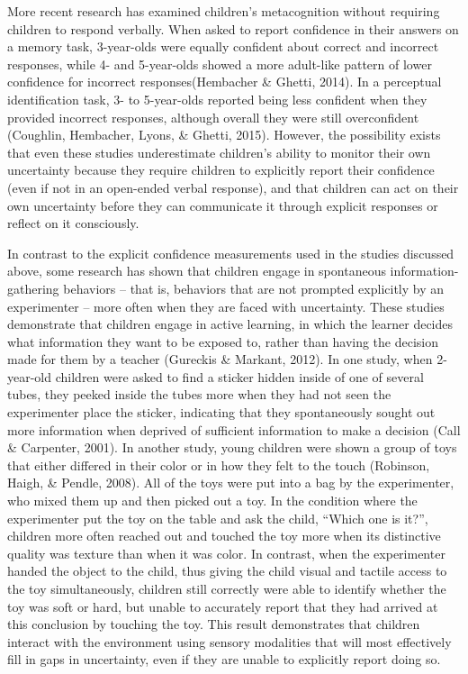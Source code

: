\documentclass[man]{apa6}
\theoremstyle{definition}
\theoremstyle{definition}
\theoremstyle{definition}
\theoremstyle{remark}
\begin{document}
More recent research has examined children's metacognition without
requiring children to respond verbally. When asked to report confidence
in their answers on a memory task, 3-year-olds were equally confident
about correct and incorrect responses, while 4- and 5-year-olds showed a
more adult-like pattern of lower confidence for incorrect
responses(Hembacher \& Ghetti, 2014). In a perceptual identification
task, 3- to 5-year-olds reported being less confident when they provided
incorrect responses, although overall they were still overconfident
(Coughlin, Hembacher, Lyons, \& Ghetti, 2015). However, the possibility
exists that even these studies underestimate children's ability to
monitor their own uncertainty because they require children to
explicitly report their confidence (even if not in an open-ended verbal
response), and that children can act on their own uncertainty before
they can communicate it through explicit responses or reflect on it
consciously.

In contrast to the explicit confidence measurements used in the studies
discussed above, some research has shown that children engage in
spontaneous information-gathering behaviors -- that is, behaviors that
are not prompted explicitly by an experimenter -- more often when they
are faced with uncertainty. These studies demonstrate that children
engage in active learning, in which the learner decides what information
they want to be exposed to, rather than having the decision made for
them by a teacher (Gureckis \& Markant, 2012). In one study, when
2-year-old children were asked to find a sticker hidden inside of one of
several tubes, they peeked inside the tubes more when they had not seen
the experimenter place the sticker, indicating that they spontaneously
sought out more information when deprived of sufficient information to
make a decision (Call \& Carpenter, 2001). In another study, young
children were shown a group of toys that either differed in their color
or in how they felt to the touch (Robinson, Haigh, \& Pendle, 2008). All
of the toys were put into a bag by the experimenter, who mixed them up
and then picked out a toy. In the condition where the experimenter put
the toy on the table and ask the child, \enquote{Which one is it?},
children more often reached out and touched the toy more when its
distinctive quality was texture than when it was color. In contrast,
when the experimenter handed the object to the child, thus giving the
child visual and tactile access to the toy simultaneously, children
still correctly were able to identify whether the toy was soft or hard,
but unable to accurately report that they had arrived at this conclusion
by touching the toy. This result demonstrates that children interact
with the environment using sensory modalities that will most effectively
fill in gaps in uncertainty, even if they are unable to explicitly
report doing so.
\end{document}
